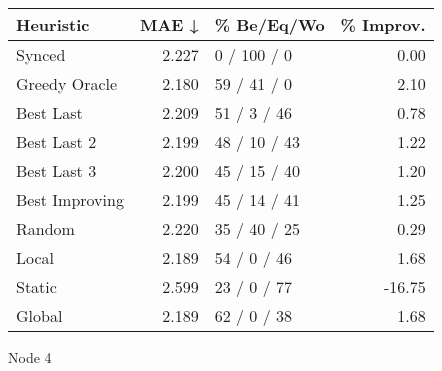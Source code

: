 \begin{tabular}{lrlr}
\toprule
\textbf{Heuristic} & \textbf{MAE ↓} & \textbf{\% Be/Eq/Wo} & \textbf{\% Improv.} \\
\midrule
            Synced &          2.227 &          0 / 100 / 0 &                0.00 \\
     Greedy Oracle &          2.180 &          59 / 41 / 0 &                2.10 \\
         Best Last &          2.209 &          51 / 3 / 46 &                0.78 \\
       Best Last 2 &          2.199 &         48 / 10 / 43 &                1.22 \\
       Best Last 3 &          2.200 &         45 / 15 / 40 &                1.20 \\
    Best Improving &          2.199 &         45 / 14 / 41 &                1.25 \\
            Random &          2.220 &         35 / 40 / 25 &                0.29 \\
             Local &          2.189 &          54 / 0 / 46 &                1.68 \\
            Static &          2.599 &          23 / 0 / 77 &              -16.75 \\
            Global &          2.189 &          62 / 0 / 38 &                1.68 \\
\bottomrule
\end{tabular}
\caption{Node 4}
\label{tab:hr_iid_lr01_le1_bs4_4}
